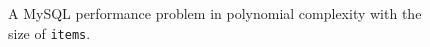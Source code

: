 \begin{figure}
\centering
\scriptsize
{}
  \mbox{}
  \vspace{-0.1in}
  {A MySQL performance problem in polynomial complexity with the size of \texttt{items}.}{}
\end{figure}